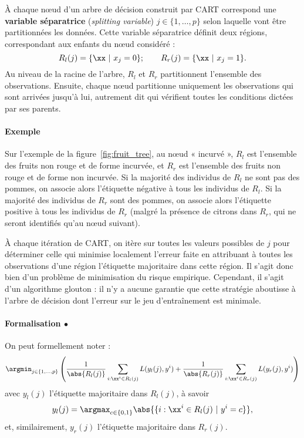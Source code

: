 À chaque n{\oe}ud d'un arbre de décision construit par CART correspond une
\textbf{variable séparatrice} ({\it splitting variable})
$j \in \{1, \dots, p\}$ selon laquelle vont être partitionnées les
données. Cette variable séparatrice définit deux régions, correspondant aux
enfants du n{\oe}ud considéré :
\begin{equation*}
  R_l(j) = \{\xx~|~x_j = 0\} ; \hspace{2em} 
  R_r(j) =  \{\xx~|~x_j = 1\}.
\end{equation*}
Au niveau de la racine de l'arbre, $R_l$ et $R_r$ partitionnent l'ensemble des
observations. Ensuite, chaque n{\oe}ud partitionne uniquement les observations
qui sont arrivées jusqu'à lui, autrement dit qui vérifient toutes les
conditions dictées par ses parents. 

\paragraph{Exemple} Sur l'exemple de la figure~\ref{fig:fruit_tree}, au
n{\oe}ud « incurvé », $R_l$ est l'ensemble des fruits non rouge et de forme
incurvée, et $R_r$ est l'ensemble des fruits non rouge et de forme non incurvée. Si
la majorité des individus de $R_l$ ne sont pas des pommes, on associe alors
l'étiquette négative à tous les individus de $R_l$. Si la majorité des
individus de $R_r$ sont des pommes, on associe alors l'étiquette positive à
tous les individus de $R_r$ (malgré la présence de citrons dans $R_r$, qui ne
seront identifiés qu'au n{\oe}ud suivant).

À chaque itération de CART, on itère sur toutes les valeurs possibles de $j$
pour déterminer celle qui minimise localement l'erreur faite en attribuant à
toutes les observations d'une région l'étiquette majoritaire dans cette région.
Il s'agit donc bien d'un problème de minimisation du risque
empirique. Cependant, il s'agit d'un algorithme glouton : il n'y a aucune
garantie que cette stratégie aboutisse à l'arbre de décision dont l'erreur sur
le jeu d'entraînement est minimale.

\paragraph{Formalisation $\bullet$} On peut formellement noter :
\begin{equation}
  \argmin_{j \in \{1, \dots, p\}} \left( 
    \frac1{\abs{R_l(j)}} \sum_{i: \xx^i \in R_l(j)} L(y_l(j), y^i)  + 
     \frac1{\abs{R_r(j)}} \sum_{i: \xx^i \in R_r(j)} L(y_r(j), y^i)
   \right)
   \label{eq:erm_binary_tree}
\end{equation}
avec $y_l(j)$ l'étiquette majoritaire dans $R_l(j)$, à savoir
\begin{equation*}
y_l(j) = \argmax_{c \in \{0, 1\}} \abs{\{i:\xx^i \in R_l(j) ~|~y^i=c\}},
\end{equation*}
et, similairement, 
$y_r(j)$ l'étiquette majoritaire dans $R_r(j)$.

